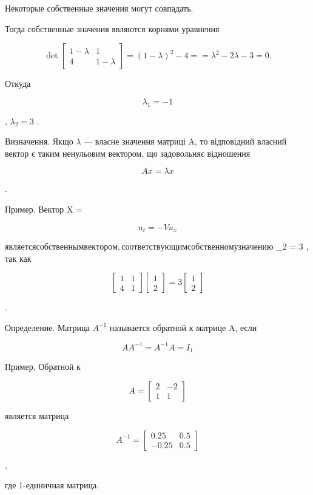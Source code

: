 \documentclass[
  ukrainian,
]{article}
\begin{document}
Некоторые собственные значения могут совпадать.

Тогда собственные значения являются корнями уравнения

\[
\det
\begin{bmatrix} 1-\lambda & 1\\ 4 & 1-\lambda \end{bmatrix}
= (1-\lambda)^2 - 4 =
= \lambda^2 - 2\lambda - 3 = 0.
\]

Откуда

\[
\lambda_1 = -1
\]

, \(\lambda_2 = 3\) .

Визначення. Якщо \(\lambda\) --- власне значення матриці A, то
відповідний власний вектор є таким ненульовим вектором, що задовольняє
відношення

\[
Ax = \lambda x
\]

.

Пример. Вектор X =

\[
u_t = -Vu_x
\]

\(является собственным вектором, соответствующим собственному значению\)
\lambda\_2 = 3 , так как

\[
\begin{bmatrix} 1 & 1 \\ 4 & 1 \end{bmatrix}
\begin{bmatrix} 1 \\ 2 \end{bmatrix}
= 3
\begin{bmatrix} 1 \\ 2 \end{bmatrix}
\]

.

Определение. Матрица \(A^{-1}\) называется обратной к матрице A, если

\[
AA^{-1} = A^{-1}A = I_1
\]

Пример, Обратной к

\[
A =
\begin{bmatrix} 2 & -2 \\ 1 & 1 \end{bmatrix}
\]

является матрица

\[
A^{-1} =
\begin{bmatrix} 0.25 & 0.5 \\ -0.25 & 0.5 \end{bmatrix}
\]

,

где 1-единичная матрица.
\end{document}
